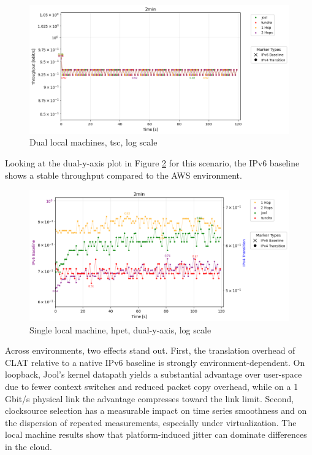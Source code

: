 \begin{figure}[H]
    \centering
    \includegraphics[width=1\textwidth]{resources/finalPlots/combinedplots/DoubleLocal_tcp_sameScale_tsc_2min_log.png}
    \caption{Dual local machines, tsc, log scale}
    \label{fig:Dual_tcp_sameScale_tsc_log}
\end{figure}

Looking at the dual-y-axis plot in Figure \ref{fig:Double_tcp_dualAxis_hpet_log} for this scenario, the IPv6 baseline shows a stable throughput compared to the AWS environment.
\begin{figure}[H]
    \centering
    \includegraphics[width=1\textwidth]{resources/finalPlots/Jitterplots/LocalDouble_tcp_dualAxis_hpet_2min_log.png}
    \caption{Single local machine, hpet, dual-y-axis, log scale}
    \label{fig:Double_tcp_dualAxis_hpet_log}
\end{figure}

Across environments, two effects stand out. First, the translation overhead of CLAT relative to a native IPv6 baseline is strongly environment-dependent. On loopback, Jool’s kernel datapath yields a substantial advantage over user-space due to fewer context switches and reduced packet copy overhead, while on a 1 Gbit/s physical link the advantage compresses toward the link limit. Second, clocksource selection has a measurable impact on time series smoothness and on the dispersion of repeated measurements, especially under virtualization. The local machine results show that platform-induced jitter can dominate differences in the cloud.

